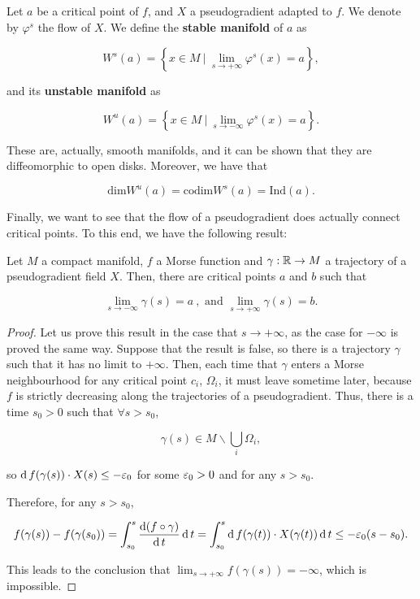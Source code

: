\begin{deff}
Let $a$ be a critical point of $f$, and $X$ a pseudogradient adapted to $f$. We denote by $\varphi^s$ the flow of $X$. We define the {\bf stable manifold} of $a$ as

$$W^s(a) = \left\{ x \in M \ | \ \lim_{s \rightarrow + \infty} \varphi^s(x) = a \right\}, $$

and its {\bf unstable manifold} as

$$W^u(a) = \left\{ x \in M \ | \ \lim_{s \rightarrow - \infty} \varphi^s(x) = a \right\} .$$
\end{deff}

These are, actually, smooth manifolds, and it can be shown that they are diffeomorphic to open disks. Moreover, we have that

$$\text{dim} W^u(a) = \text{codim} W^s(a) = \text{Ind}(a) .$$

Finally, we want to see that the flow of a pseudogradient does actually connect critical points. To this end, we have the following result:

\begin{prop}
Let $M$ a compact manifold, $f$ a Morse function and $\gamma : \mathbb{R} \rightarrow M$ a trajectory of a pseudogradient field $X$. Then, there are critical points $a$ and $b$ such that

\begin{displaymath}
\lim_{s \rightarrow - \infty} \gamma(s) = a \ , \text{ and } \lim_{s \rightarrow + \infty} \gamma(s) = b .
\end{displaymath}
\end{prop}

\begin{proof}
Let us prove this result in the case that $s \rightarrow + \infty$, as the case for $- \infty$ is proved the same way. Suppose that the result is false, so there is a trajectory $\gamma$ such that it has no limit to $+ \infty$. Then, each time that $\gamma$ enters a Morse neighbourhood for any critical point $c_i$, $\Omega_i$, it must leave sometime later, because $f$ is strictly decreasing along the trajectories of a pseudogradient. Thus, there is a time $s_0 > 0$ such that $\forall s > s_0$,

$$\gamma(s) \in M \backslash \bigcup_i \Omega_i ,$$

so $\operatorname d f(\gamma(s)) \cdot X(s) \leq - \varepsilon_0$ for some $\varepsilon_0 > 0$ and for any $s > s_0$.

Therefore, for any $s > s_0$,

\begin{displaymath}
f(\gamma(s))-f(\gamma(s_0)) = \int_{s_0}^s \frac{\operatorname d (f \circ \gamma)}{\operatorname d t} \operatorname d t = \int_{s_0}^s \operatorname d f(\gamma(t)) \cdot X(\gamma(t)) \operatorname d t \leq - \varepsilon_0 (s-s_0) .
\end{displaymath}

This leads to the conclusion that $\displaystyle\lim_{s \rightarrow +\infty} f(\gamma(s)) = - \infty$, which is impossible.
\end{proof}
